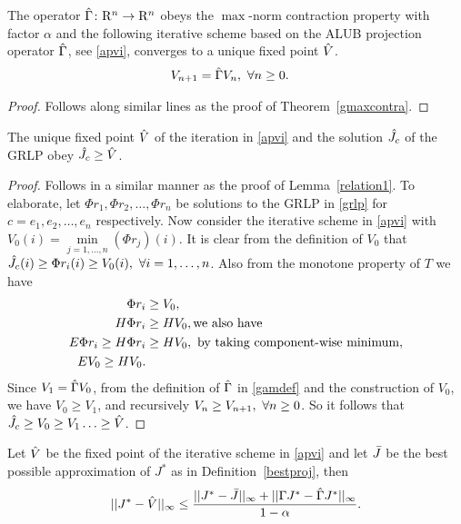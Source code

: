 \begin{theorem}\label{tgmaxcontra}
The operator $\hat{\Gamma} \colon \mathrm{R}^n\rightarrow \mathrm{R}^n$ obeys the $\max$-norm contraction property with factor $\alpha$ and the following iterative scheme based on the ALUB projection operator $\hat{\Gamma}$, see \eqref{apvi}, converges to a unique fixed point $\hat{V}$.
\begin{align}\label{apvi}
V_{n+1}&=\hat{\Gamma} V_n,\mbox{ }\forall n\geq 0.
\end{align}
\end{theorem}
\begin{proof}
Follows along similar lines as the proof of Theorem~\ref{gmaxcontra}.
\end{proof}
\begin{lemma}\label{relation2}
The unique fixed point $\hat{V}$ of the iteration in \eqref{apvi} and the solution $\hat{J}_c$ of the GRLP obey $\hat{J}_c\geq\hat{V}$.
\end{lemma}
\begin{proof}
Follows in a similar manner as the proof of Lemma~\ref{relation1}. To elaborate, let $\Phi r_1, \Phi r_2,\ldots,\Phi r_n$ be solutions to the GRLP in \eqref{grlp} for $c=e_1, e_2,\ldots,e_n$ respectively. Now consider the iterative scheme in \eqref{apvi} with $V_0(i)=\underset{j=1,\ldots,n}{\min}(\Phi r_j)(i)$. It is clear from the definition of $V_0$ that $\hat{J}_c(i)\geq\Phi r_i(i)\geq V_0(i), \mbox{ } \forall i=1,\ldots,n$. Also from the monotone property of $T$ we have 
\begin{align}
\Phi r_i&\geq V_0,\nonumber\\
H\Phi r_i&\geq H V_0,\mbox{we also have}\nonumber\\
E\Phi r_i\geq H\Phi r_i&\geq HV_0,\mbox{ }\text{by taking component-wise minimum},\nonumber\\
E V_0\geq H V_0.
\end{align}
Since $V_1=\hat{\Gamma} V_0$, from the definition of $\hat{\Gamma}$ in \eqref{gamdef} and the construction of $V_0$, we have $V_0\geq V_1$, and recursively $V_{n}\geq V_{n+1}, \mbox{ }\forall n\geq 0$. So it follows that $\hat{J}_c\geq V_0\geq V_1\ldots\geq \hat{V}$.
\end{proof}
\begin{theorem}\label{mt1}
Let $\hat{V}$ be the fixed point of the iterative scheme in \eqref{apvi} and let $\bar{J}$ be the best possible approximation of $J^*$ as in Definition~\ref{bestproj}, then
\begin{align}
||J^*-\hat{V}||_\infty\leq \frac{||J^*-\bar{J}||_\infty+||\Gamma J^*-\hat{\Gamma} J^*||_\infty}{1-\alpha}.
\end{align}
\end{theorem}
